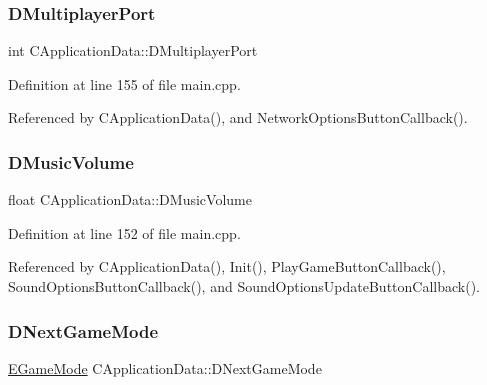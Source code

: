\subsubsection{\texorpdfstring{D\+Multiplayer\+Port}{DMultiplayerPort}}
{\footnotesize\ttfamily int C\+Application\+Data\+::\+D\+Multiplayer\+Port\hspace{0.3cm}{\ttfamily [protected]}}



Definition at line 155 of file main.\+cpp.



Referenced by C\+Application\+Data(), and Network\+Options\+Button\+Callback().

\hypertarget{classCApplicationData_a8bc61af4a83a667102e55cca2a739c3b}{}\label{classCApplicationData_a8bc61af4a83a667102e55cca2a739c3b} 
\subsubsection{\texorpdfstring{D\+Music\+Volume}{DMusicVolume}}
{\footnotesize\ttfamily float C\+Application\+Data\+::\+D\+Music\+Volume\hspace{0.3cm}{\ttfamily [protected]}}



Definition at line 152 of file main.\+cpp.



Referenced by C\+Application\+Data(), Init(), Play\+Game\+Button\+Callback(), Sound\+Options\+Button\+Callback(), and Sound\+Options\+Update\+Button\+Callback().

\hypertarget{classCApplicationData_a3b67edeacd70201dcf96fa9fa8aa2107}{}\label{classCApplicationData_a3b67edeacd70201dcf96fa9fa8aa2107} 
\subsubsection{\texorpdfstring{D\+Next\+Game\+Mode}{DNextGameMode}}
{\footnotesize\ttfamily \hyperlink{classCApplicationData_ac8ac37a4c8bb871036fbbdc6a072e403}{E\+Game\+Mode} C\+Application\+Data\+::\+D\+Next\+Game\+Mode\hspace{0.3cm}{\ttfamily [protected]}}



